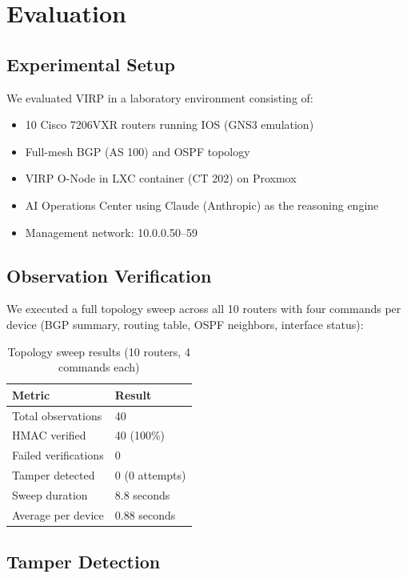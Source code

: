 \documentclass[11pt,twocolumn]{article}
\begin{document}
\section{Evaluation}

\subsection{Experimental Setup}

We evaluated VIRP in a laboratory environment consisting of:

\begin{itemize}[leftmargin=*]
    \item 10 Cisco 7206VXR routers running IOS (GNS3 emulation)
    \item Full-mesh BGP (AS 100) and OSPF topology
    \item VIRP O-Node in LXC container (CT 202) on Proxmox
    \item AI Operations Center using Claude (Anthropic) as the reasoning engine
    \item Management network: 10.0.0.50--59
\end{itemize}

\subsection{Observation Verification}

We executed a full topology sweep across all 10 routers with four commands per device (BGP summary, routing table, OSPF neighbors, interface status):

\begin{table}[h]
\centering
\small
\begin{tabular}{ll}
\toprule
\textbf{Metric} & \textbf{Result} \\
\midrule
Total observations & 40 \\
HMAC verified & 40 (100\%) \\
Failed verifications & 0 \\
Tamper detected & 0 (0 attempts) \\
Sweep duration & 8.8 seconds \\
Average per device & 0.88 seconds \\
\bottomrule
\end{tabular}
\caption{Topology sweep results (10 routers, 4 commands each)}
\label{tab:sweep}
\end{table}

\subsection{Tamper Detection}
\end{document}
